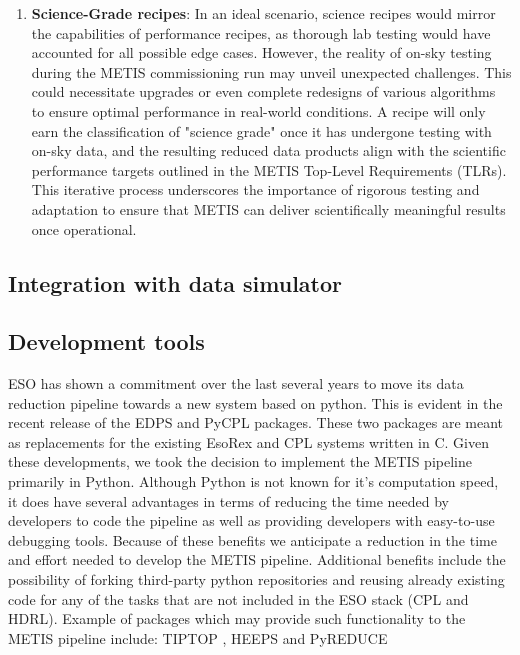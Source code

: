 \documentclass[a4paper]{spie}  %
\begin{document}
\begin{enumerate}
     \item \textbf{Science-Grade recipes}: In an ideal scenario, science recipes would mirror the capabilities of performance recipes, as thorough lab testing would have accounted for all possible edge cases. However, the reality of on-sky testing during the METIS commissioning run may unveil unexpected challenges. This could necessitate upgrades or even complete redesigns of various algorithms to ensure optimal performance in real-world conditions. A recipe will only earn the classification of "science grade" once it has undergone testing with on-sky data, and the resulting reduced data products align with the scientific performance targets outlined in the METIS Top-Level Requirements (TLRs). This iterative process underscores the importance of rigorous testing and adaptation to ensure that METIS can deliver scientifically meaningful results once operational. 
 \end{enumerate}


\subsection{Integration with data simulator}
\label{subsec:imp_sim}





\subsection{Development tools}
\label{subsec:imp_tools}
ESO has shown a commitment over the last several years to move its data reduction pipeline towards a new system based on python. 
This is evident in the recent release of the EDPS \cite{edps} and PyCPL \cite{pycpl} packages.
These two packages are meant as replacements for the existing EsoRex and CPL systems written in C.
Given these developments, we took the decision to implement the METIS pipeline primarily in Python.
Although Python is not known for it's computation speed, it does have several advantages in terms of reducing the time needed by developers to code the pipeline as well as providing developers with easy-to-use debugging tools. 
Because of these benefits we anticipate a reduction in the time and effort needed to develop the METIS pipeline.
Additional benefits include the possibility of forking third-party python repositories and reusing already existing code for any of the tasks that are not included in the ESO stack (CPL and HDRL). 
Example of packages which may provide such functionality to the METIS pipeline include: TIPTOP \cite{tiptop}, HEEPS \cite{HEEPS} and PyREDUCE \cite{pyreduce}
\end{document}
